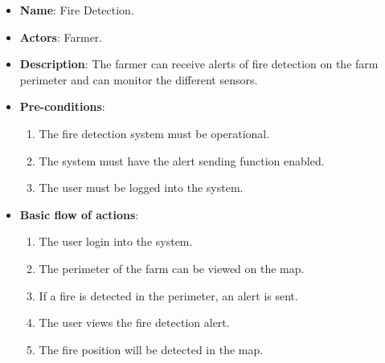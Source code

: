 \begin{itemize}
    \item \textbf{Name}: Fire Detection.
    \item \textbf{Actors}: Farmer.
    \item \textbf{Description}: The farmer can receive alerts of fire detection on the farm perimeter and can monitor the different sensors.
    \item \textbf{Pre-conditions}:
        \begin{enumerate}
            \item The fire detection system must be operational.
            \item The system must have the alert sending function enabled.
            \item The user must be logged into the system.
        \end{enumerate}
    \item \textbf{Basic flow of actions}:
        \begin{enumerate}
            \item The user login into the system.
            \item The perimeter of the farm can be viewed on the map.
            \item If a fire is detected in the perimeter, an alert is sent.
            \item The user views the fire detection alert.
            \item The fire position will be detected in the map.
        \end{enumerate}
\end{itemize}

